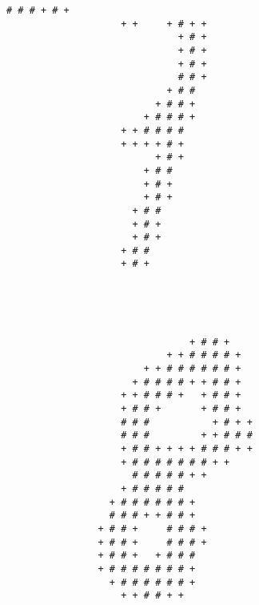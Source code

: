 \begin{multicols*}{2}
\begin{Verbatim}[samepage=true]
                    # # # + # +                         
                    + +     + # + +                     
                              + # +                     
                              + # +                     
                              + # +                     
                              # # +                     
                            + # #                       
                          + # # +                       
                        + # # # +                       
                    + + # # # #                         
                    + + + + # +                         
                          + # +                         
                        + # #                           
                        + # +                           
                        + # +                           
                      + # #                             
                      + # +                             
                      + # +                             
                    + # #                               
                    + # +                               
                                                        
                                                        
\end{Verbatim}
\begin{Verbatim}[samepage=true]
                                                        
                                                        
                                + # # +                 
                            + + # # # # +               
                        + + # # # # # # +               
                      + # # # # + + # # +               
                    + + # # # +   + # # +               
                    + # # +       + # # +               
                    # # #           + # + +             
                    # # #         + + # # #             
                    + # # + + + + # # # + +             
                    + # # # # # # # + +                 
                      # # # # # + +                     
                    + # # # # #                         
                  + # # # # # # +                       
                  # # # + + # # +                       
                + # # +     # # # +                     
                + # # +     # # # +                     
                + # # +   + # # #                       
                + # # # # # # # +                       
                  + # # # # # # +                       
                    + + # # + +                         
                                                        

\end{Verbatim}
\end{multicols*}

